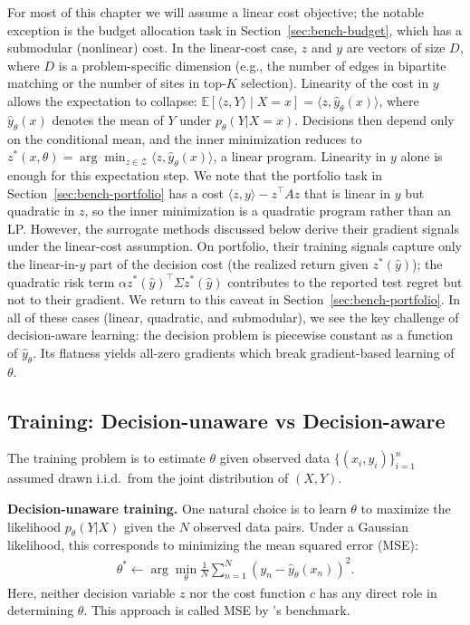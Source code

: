 For most of this chapter we will assume a linear cost objective; the notable exception is the budget allocation task in Section~\ref{sec:bench-budget}, which has a submodular (nonlinear) cost.
In the linear-cost case, $z$ and $y$ are vectors of size $D$, where $D$ is a problem-specific dimension (e.g., the number of edges in bipartite matching or the number of sites in top-$K$ selection). Linearity of the cost in $y$ allows the expectation to collapse: $\mathbb{E}[\langle z, Y\rangle\mid X{=}x] = \langle z, \hat{y}_{\theta}(x)\rangle$, where $\hat{y}_{\theta}(x)$ denotes the mean of $Y$ under $p_{\theta}(Y | X=x)$. Decisions then depend only on the conditional mean, and the inner minimization reduces to $z^*(x,\theta) = \arg\!\min_{z \in \mathcal{Z}} \langle z, \hat{y}_{\theta}(x) \rangle$, a linear program. Linearity in $y$ alone is enough for this expectation step. We note that the portfolio task in Section~\ref{sec:bench-portfolio} has a cost $\langle z, y\rangle - z^\top A z$ that is linear in $y$ but quadratic in $z$, so the inner minimization is a quadratic program rather than an LP. However, the surrogate methods discussed below derive their gradient signals under the linear-cost assumption. On portfolio, their training signals capture only the linear-in-$y$ part of the decision cost (the realized return given $z^*(\hat y)$); the quadratic risk term $\alpha z^*(\hat y)^\top \Sigma z^*(\hat y)$ contributes to the reported test regret but not to their gradient. We return to this caveat in Section~\ref{sec:bench-portfolio}.
In all of these cases (linear, quadratic, and submodular), we see the key challenge of decision-aware learning: the decision problem is piecewise constant as a function of $\hat{y}_{\theta}$. Its flatness yields all-zero gradients which break gradient-based learning of $\theta$.

\subsection{Training: Decision-unaware vs Decision-aware}

The training problem is to estimate $\theta$ given observed data $\{(x_i,y_i)\}_{i=1}^n$ assumed drawn i.i.d.\ from the joint distribution of $(X,Y)$.

\textbf{Decision-unaware training.}
One natural choice is to learn $\theta$ to maximize the likelihood $p_{\theta}(Y|X)$ given the $N$ observed data pairs. Under a Gaussian likelihood, this corresponds to minimizing the mean squared error (MSE):
\begin{align}
    \theta^* \gets \arg\!\min_{\theta} \frac{1}{N} \sum_{n=1}^N (y_n - \hat{y}_{\theta}(x_n) )^2.
\end{align}
Here, neither decision variable $z$ nor the cost function $c$ has any direct role in determining $\theta$. This approach is called MSE by \citeauthor{gengBenchmarkingPtOPnO2024}'s benchmark.

